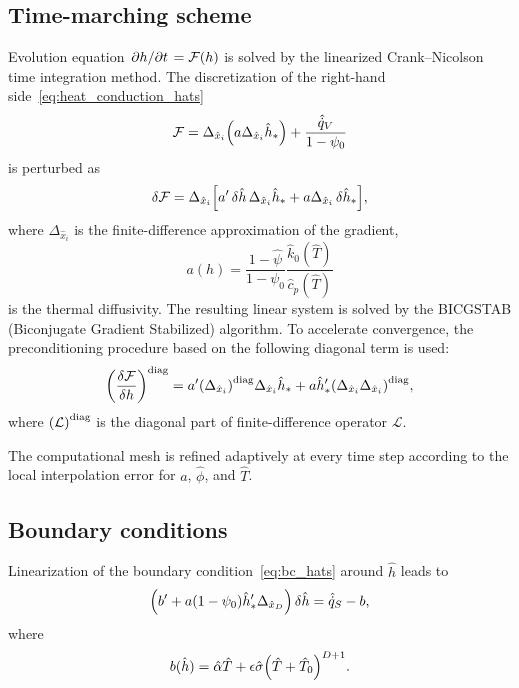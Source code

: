 \documentclass{article}
\newcommand{\dder}[2][]{\Delta_{#2}#1}
\newcommand{\diag}[1]{\qty(#1)^\mathrm{diag}}
\newcommand{\Hx}{\hat{x}}
\newcommand{\Hh}{\hat{h}}
\newcommand{\HT}{\hat{T}}
\newcommand{\Halpha}{\hat{\alpha}}
\newcommand{\Hsigma}{\hat{\sigma}}
\newcommand{\Hc}{\hat{c}}
\newcommand{\Hk}{\hat{k}}
\newcommand{\Hphi}{\hat{\phi}}
\newcommand{\Hpsi}{\hat{\psi}}
\newcommand{\Hq}{\hat{\dot{q}}}
\begin{document}
\subsection{Time-marching scheme}

Evolution equation \(\pdv*{h}{t}=\mathcal{F}(h)\) is solved by the linearized Crank--Nicolson time integration method.
The discretization of the right-hand side~\eqref{eq:heat_conduction_hats}
\begin{equation}\label{eq:rhs}
    \mathcal{F} = \dder{\Hx_i}\qty(a \dder[\Hh_*]{\Hx_i}) + \frac{\Hq_V}{1-\psi_0}
\end{equation}
is perturbed as
\begin{equation}\label{eq:Drhs}
    \var{\mathcal{F}} = \dder{\Hx_i}\qty[ a'\var{\Hh}\dder[\Hh_*]{\Hx_i} + a\dder[\var{\Hh_*}]{\Hx_i} ],
\end{equation}
where \(\dder{\Hx_i}\) is the finite-difference approximation of the gradient,
\begin{equation}\label{eq:a}
    a(h) = \frac{1-\Hpsi}{1-\psi_0}\frac{\Hk_0(\HT)}{\Hc_p(\HT)}
\end{equation}
is the thermal diffusivity.
The resulting linear system is solved by the BICGSTAB (Biconjugate Gradient Stabilized) algorithm.
To accelerate convergence, the preconditioning procedure based on the following diagonal term is used:
\begin{equation}\label{eq:Drhs_diag}
    \diag{\fdv{\mathcal{F}}{h}} = a'\diag{\dder{\Hx_i}} \dder[\Hh_*]{\Hx_i} +
        a\Hh'_*\diag{\dder{\Hx_i}\dder{\Hx_i}},
\end{equation}
where \(\diag{\mathcal{L}}\) is the diagonal part of finite-difference operator \(\mathcal{L}\).

The computational mesh is refined adaptively at every time step
according to the local interpolation error for \(a\), \(\Hphi\), and \(\HT\).

\subsection{Boundary conditions}

Linearization of the boundary condition~\eqref{eq:bc_hats} around \(\Hh\) leads to
\begin{equation}\label{eq:bc_linearized}
    \qty(b' + a\qty(1 - \psi_0) \Hh'_* \dder{\Hx_D})\var{\Hh} = \Hq_S - b,
\end{equation}
where
\begin{equation}\label{eq:bc_Dirichlet_part}
    b(\Hh) = \Halpha\HT + \epsilon\Hsigma\qty(\HT + \HT_0)^{D+1}.
\end{equation}
\end{document}
